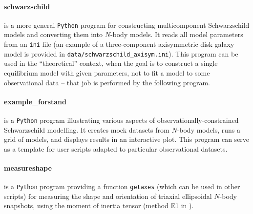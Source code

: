 \documentclass[12pt]{article}
\newcommand{\Python}{\texttt{Python}\xspace}
\begin{document}
\paragraph{schwarzschild} is a more general \Python program for constructing multicomponent Schwarzschild models and converting them into $N$-body models. It reads all model parameters from an \texttt{ini} file (an example of a three-component axisymmetric disk galaxy model is provided in \texttt{data/schwarzschild_axisym.ini}). This program can be used in the ``theoretical'' context, when the goal is to construct a single equilibrium model with given parameters, not to fit a model to some observational data -- that job is performed by the following program.

\paragraph{example_forstand} is a \Python program illustrating various aspects of observationally-constrained Schwarzschild modelling. It creates mock datasets from $N$-body models, runs a grid of models, and displays results in an interactive plot. This program can serve as a template for user scripts adapted to particular observational datasets.

\paragraph{measureshape} is a \Python program providing a function \texttt{getaxes} (which can be used in other scripts) for measuring the shape and orientation of triaxial ellipsoidal $N$-body snapshots, using the moment of inertia tensor (method E1 in \cite{Zemp2011}).

\label{sec:mkspherical}%
\end{document}
